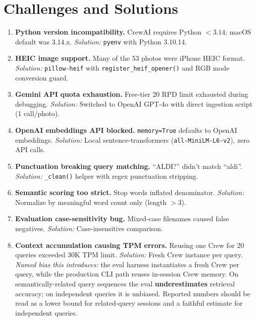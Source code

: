 \documentclass[11pt,letterpaper]{article}
\begin{document}
\section{Challenges and Solutions}
\label{sec:challenges}

\begin{enumerate}
  \item \textbf{Python version incompatibility.} CrewAI requires Python $< 3.14$; macOS default was 3.14.x. \textit{Solution:} \texttt{pyenv} with Python 3.10.14.

  \item \textbf{HEIC image support.} Many of the 53 photos were iPhone HEIC format. \textit{Solution:} \texttt{pillow-heif} with \texttt{register\_heif\_opener()} and RGB mode conversion guard.

  \item \textbf{Gemini API quota exhaustion.} Free-tier 20 RPD limit exhausted during debugging. \textit{Solution:} Switched to OpenAI GPT-4o with direct ingestion script (1 call/photo).

  \item \textbf{OpenAI embeddings API blocked.} \texttt{memory=True} defaults to OpenAI embeddings. \textit{Solution:} Local sentence-transformers (\texttt{all-MiniLM-L6-v2}), zero API calls.

  \item \textbf{Punctuation breaking query matching.} ``ALDI?'' didn't match ``aldi''. \textit{Solution:} \texttt{\_clean()} helper with regex punctuation stripping.

  \item \textbf{Semantic scoring too strict.} Stop words inflated denominator. \textit{Solution:} Normalize by meaningful word count only (length $> 3$).

  \item \textbf{Evaluation case-sensitivity bug.} Mixed-case filenames caused false negatives. \textit{Solution:} Case-insensitive comparison.

  \item \textbf{Context accumulation causing TPM errors.} Reusing one Crew for 20 queries exceeded 30K TPM limit. \textit{Solution:} Fresh Crew instance per query. \textit{Named bias this introduces:} the eval harness instantiates a fresh Crew per query, while the production CLI path reuses in-session Crew memory. On semantically-related query sequences the eval \textbf{underestimates} retrieval accuracy; on independent queries it is unbiased. Reported numbers should be read as a lower bound for related-query sessions and a faithful estimate for independent queries.


\end{enumerate}
\end{document}
